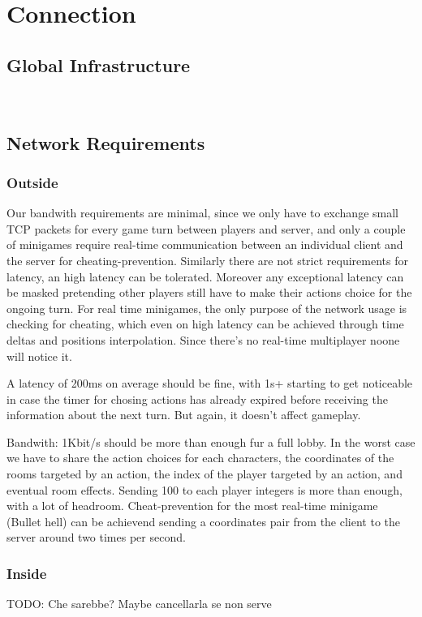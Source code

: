 \section{Connection}
\subsection{Global Infrastructure}
  ~\\
\pagebreak 
\subsection{Network Requirements}

\subsubsection{Outside}
Our bandwith requirements are minimal, since we only have to exchange small TCP packets for every game turn between players and server, and only a couple of minigames require real-time communication between an individual client and the server for cheating-prevention.
Similarly there are not strict requirements for latency, an high latency can be tolerated. Moreover any exceptional latency can be masked pretending other players still have to make their actions choice for the ongoing turn. For real time minigames, the only purpose of the network usage is checking for cheating, which even on high latency can be achieved through time deltas and positions interpolation. Since there's no real-time multiplayer noone will notice it.

A latency of 200ms on average should be fine, with 1s+ starting to get noticeable in case the timer for chosing actions has already expired before receiving the information about the next turn. But again, it doesn't affect gameplay.

Bandwith: 1Kbit/s should be more than enough fur a full lobby. In the worst case we have to share the action choices for each characters, the coordinates of the rooms targeted by an action, the index of the player targeted by an action, and eventual room effects. Sending 100 to each player integers is more than enough, with a lot of headroom. Cheat-prevention for the most real-time minigame (Bullet hell) can be achievend sending a coordinates pair from the client to the server around two times per second.



\subsubsection{Inside}
TODO: Che sarebbe? Maybe cancellarla se non serve

